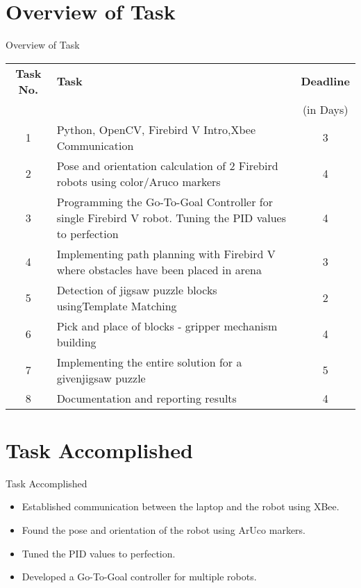 \documentclass[10pt, a4paper]{beamer}
\begin{document}
\section{Overview of Task}
\begin{frame}{Overview of Task}
	\begin{tabular}{| c | p{18 em} | c |}\hline
		\textbf{Task No.} & \hspace{7em}\textbf{Task} & \textbf{Deadline} \\
		& & (in Days)\\\hline
		1 &\small{ Python, OpenCV, Firebird V Intro,\hspace{5 em}Xbee Communication} & 3 \\\hline
		2 &\small{ Pose and orientation calculation of 2 Firebird robots using color/Aruco markers }& 4\\\hline
		3 &\small{ Programming the Go-To-Goal Controller for single Firebird V robot. Tuning the PID\hspace{3 em} values to perfection }& 4\\\hline
		4 &\small{ Implementing path planning with Firebird V where obstacles have been placed in arena }& 3\\\hline
		5 &\small{ Detection of jigsaw puzzle blocks using\hspace{3 em}Template Matching} & 2\\\hline
		6 &\small{ Pick and place of blocks - gripper mechanism building }& 4\\\hline
		7 &\small{ Implementing the entire solution for a given\hspace{3 em}jigsaw puzzle }& 5\\\hline
		8 &\small{ Documentation and reporting results }& 4\\\hline
	\end{tabular}
\end{frame}

\section{Task Accomplished}
\begin{frame}{Task Accomplished}
	\begin{itemize}
		\item Established communication between the laptop and the robot using XBee.
		\item Found the pose and orientation of the robot using ArUco markers.
		\item Tuned the PID values to perfection.
		\item Developed a Go-To-Goal controller for multiple robots.
	\end{itemize}
\end{frame}
\end{document}
